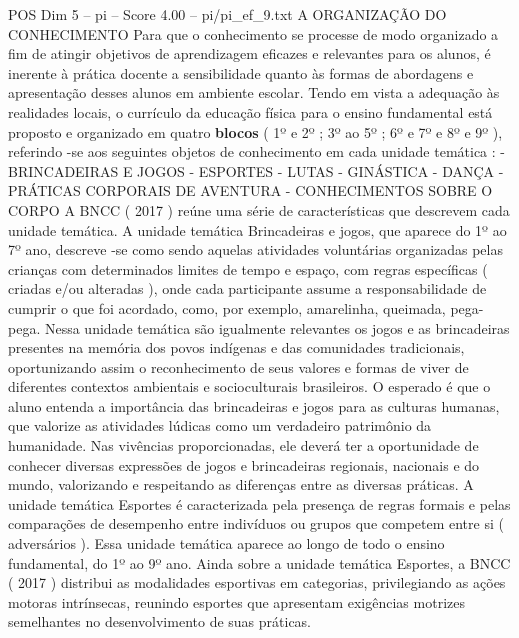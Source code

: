 \begin{textsample}{POS Dim 5 – pi – Score 4.00 – pi/pi\_ef\_9.txt}  \label{ex:f5_pos_238}
A ORGANIZAÇÃO DO CONHECIMENTO Para que o conhecimento se processe de modo organizado a fim de atingir objetivos de aprendizagem eficazes e relevantes para os alunos, é inerente à prática docente a sensibilidade quanto às formas de abordagens e apresentação desses alunos em ambiente escolar.
Tendo em vista a adequação às realidades locais, o currículo da educação física para o ensino fundamental está proposto e organizado em quatro \textbf{blocos} ( 1º e 2º ; 3º ao 5º ; 6º e 7º e 8º e 9º ), referindo -se aos seguintes objetos de conhecimento em cada unidade temática : - BRINCADEIRAS E JOGOS - ESPORTES - LUTAS - GINÁSTICA - DANÇA - PRÁTICAS CORPORAIS DE AVENTURA - CONHECIMENTOS SOBRE O CORPO A BNCC ( 2017 ) reúne uma série de características que descrevem cada unidade temática.
A unidade temática Brincadeiras e jogos, que aparece do 1º ao 7º ano, descreve -se como sendo aquelas atividades voluntárias organizadas pelas crianças com determinados limites de tempo e espaço, com regras específicas ( criadas e/ou alteradas ), onde cada participante assume a responsabilidade de cumprir o que foi acordado, como, por exemplo, amarelinha, queimada, pega-pega.
Nessa unidade temática são igualmente relevantes os jogos e as brincadeiras presentes na memória dos povos indígenas e das comunidades tradicionais, oportunizando assim o reconhecimento de seus valores e formas de viver de diferentes contextos ambientais e socioculturais brasileiros.
O esperado é que o aluno entenda a importância das brincadeiras e jogos para as culturas humanas, que valorize as atividades lúdicas como um verdadeiro patrimônio da humanidade.
Nas vivências proporcionadas, ele deverá ter a oportunidade de conhecer diversas expressões de jogos e brincadeiras regionais, nacionais e do mundo, valorizando e respeitando as diferenças entre as diversas práticas.
A unidade temática Esportes é caracterizada pela presença de regras formais e pelas comparações de desempenho entre indivíduos ou grupos que competem entre si ( adversários ).
Essa unidade temática aparece ao longo de todo o ensino fundamental, do 1º ao 9º ano.
Ainda sobre a unidade temática Esportes, a BNCC ( 2017 ) distribui as modalidades esportivas em categorias, privilegiando as ações motoras intrínsecas, reunindo esportes que apresentam exigências motrizes semelhantes no desenvolvimento de suas práticas.

\end{textsample}
